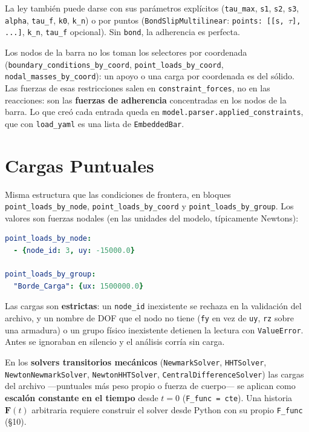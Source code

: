 \documentclass[11pt,oneside]{report}
\begin{document}
La ley también puede darse con sus parámetros explícitos (\texttt{tau\_max}, \texttt{s1}, \texttt{s2}, \texttt{s3}, \texttt{alpha}, \texttt{tau\_f}, \texttt{k0}, \texttt{k\_n}) o por puntos (\texttt{BondSlipMultilinear}: \texttt{points: [[s, \ensuremath{\tau}], .\allowbreak{}.\allowbreak{}.\allowbreak{}]}, \texttt{k\_n}, \texttt{tau\_f} opcional). Sin \texttt{bond}, la adherencia es perfecta.


Los nodos de la barra no los toman los selectores por coordenada (\texttt{boundary\_\allowbreak{}conditions\_\allowbreak{}by\_\allowbreak{}coord}, \texttt{point\_\allowbreak{}loads\_\allowbreak{}by\_\allowbreak{}coord}, \texttt{nodal\_\allowbreak{}masses\_\allowbreak{}by\_\allowbreak{}coord}): un apoyo o una carga por coordenada es del sólido. Las fuerzas de esas restricciones salen en \texttt{constraint\_\allowbreak{}forces}, no en las reacciones: son las \textbf{fuerzas de adherencia} concentradas en los nodos de la barra. Lo que creó cada entrada queda en \texttt{model.\allowbreak{}parser.\allowbreak{}applied\_\allowbreak{}constraints}, que con \texttt{load\_yaml} es una lista de \texttt{EmbeddedBar}.

\section{Cargas Puntuales}

Misma estructura que las condiciones de frontera, en bloques \texttt{point\_\allowbreak{}loads\_\allowbreak{}by\_\allowbreak{}node}, \texttt{point\_\allowbreak{}loads\_\allowbreak{}by\_\allowbreak{}coord} y \texttt{point\_\allowbreak{}loads\_\allowbreak{}by\_\allowbreak{}group}. Los valores son fuerzas nodales (en las unidades del modelo, típicamente Newtons):

\begin{lstlisting}[language=yaml]
point_loads_by_node:
  - {node_id: 3, uy: -15000.0}

point_loads_by_group:
  "Borde_Carga": {ux: 1500000.0}

\end{lstlisting}

Las cargas son \textbf{estrictas}: un \texttt{node\_id} inexistente se rechaza en la validación del archivo, y un nombre de DOF que el nodo no tiene (\texttt{fy} en vez de \texttt{uy}, \texttt{rz} sobre una armadura) o un grupo físico inexistente detienen la lectura con \texttt{ValueError}. Antes se ignoraban en silencio y el análisis corría sin carga.

En los \textbf{solvers transitorios mecánicos} (\texttt{NewmarkSolver}, \texttt{HHTSolver}, \texttt{NewtonNewmarkSolver}, \texttt{NewtonHHTSolver}, \texttt{CentralDifferenceSolver}) las cargas del archivo ---puntuales más peso propio o fuerza de cuerpo--- se aplican como \textbf{escalón constante en el tiempo} desde $t = 0$ (\texttt{F\_func = cte}). Una historia $\mathbf F(t)$ arbitraria requiere construir el solver desde Python con su propio \texttt{F\_func} (§10).
\end{document}

